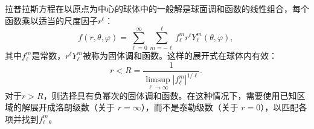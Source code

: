 拉普拉斯方程在以原点为中心的球体中的一般解是球面调和函数的线性组合，每个函数乘以适当的尺度因子\( r^\ell \)：
\[
f(r, \theta, \varphi) = \sum_{\ell = 0}^{\infty} \sum_{m = -\ell}^{\ell} f_{\ell}^m r^\ell Y_{\ell}^m(\theta, \varphi),~
\]
其中\( f_{\ell}^m \)是常数，\( r^\ell Y_{\ell}^m \)被称为固体调和函数。这样的展开式在球体内有效：
\[
r < R = \frac{1}{\limsup_{\ell \to \infty} |f_{\ell}^m|^{1/\ell}}.~
\]
对于\( r > R \)，则选择具有负幂次的固体调和函数。在这种情况下，需要使用已知区域的解展开成洛朗级数（关于 \( r = \infty \)），而不是泰勒级数（关于 \( r = 0 \)），以匹配各项并找到\( f_{\ell}^m \)。